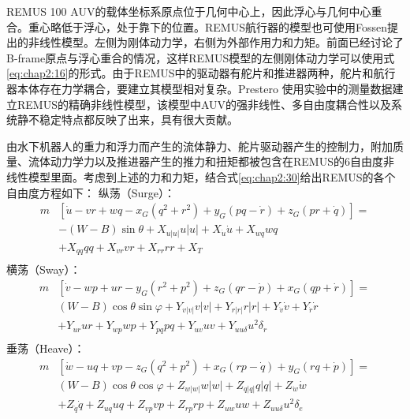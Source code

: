REMUS 100 AUV的载体坐标系原点位于几何中心上，因此浮心与几何中心重合。重心略低于浮心，处于靠下的位置。REMUS航行器的模型也可使用Fossen提出的非线性模型。左侧为刚体动力学，右侧为外部作用力和力矩。前面已经讨论了B-frame原点与浮心重合的情况，这样REMUS模型的左侧刚体动力学可以使用式\ref{eq:chap2:16}的形式。由于REMUS中的驱动器有舵片和推进器两种，舵片和航行器本体存在力学耦合，要建立其模型相对复杂。Prestero\cite{prestero2001verification} 使用实验中的测量数据建立REMUS的精确非线性模型，该模型中AUV的强非线性、多自由度耦合性以及系统静不稳定特点都反映了出来，具有很大贡献。

由水下机器人的重力和浮力而产生的流体静力、舵片驱动器产生的控制力，附加质量、流体动力学力以及推进器产生的推力和扭矩都被包含在REMUS的6自由度非线性模型里面。考虑到上述的力和力矩，结合式\ref{eq:chap2:30}给出REMUS的各个自由度方程如下：
纵荡（Surge）：
\begin{equation}
\label{eq:chap2:surgeremus}
\begin{aligned}
m &\left[ \dot u - vr  + wq - {x_G}({q^2} + {r^2}) + {y_G}(pq - \dot r) + {z_G}(pr + \dot q) \right] =  \\
&- (W - B)\sin \theta  + {X_{u\left| u \right|}}u\left| u \right| + {X_{\dot u}}\dot u + {X_{wq}}wq\\
&+ {X_{qq}}qq + {X_{vr}}vr + {X_{rr}}rr + {X_T}  \\
\end{aligned}
\end{equation}
横荡（Sway）：
\begin{equation}
\label{eq:chap2:swayremus}
\begin{aligned}
 m&\left[ {\dot v - wp + ur - {y_G}({r^2} + {p^2}) + {z_G}(qr - \dot p) + {x_G}(qp + \dot r)} \right] =\\
 & (W - B)\cos \theta \sin \varphi  + {Y_{v\left| v \right|}}v\left| v \right| + {Y_{r\left| r \right|}}r\left| r \right| + {Y_{\dot v}}\dot v + {Y_{\dot r}}\dot r \\
 &+ {Y_{ur}}ur + {Y_{wp}}wp + {Y_{pq}}pq +  {Y_{uv}}uv + {Y_{uu\delta }}{u^2}{\delta _r}  \\
\end{aligned}
\end{equation}
垂荡（Heave）：
\begin{equation}
\label{eq:chap2:heaveremus}
\begin{aligned}
 m&\left[ {\dot w - uq + vp - {z_G}({q^2} + {p^2}) + {x_G}(rp - \dot q) + {y_G}(rq + \dot p)} \right] =\\
 & (W - B)\cos \theta \cos \varphi  + {Z_{w\left| w \right|}}w\left| w \right| + {Z_{q\left| q \right|}}q\left| q \right| + {Z_{\dot w}}\dot w \\
 &+ {Z_{\dot q}}\dot q + {Z_{uq}}uq + {Z_{vp}}vp + {Z_{rp}}rp + {Z_{uw}}uw + {Z_{uu\delta }}{u^2}{\delta _e}  \\
\end{aligned}
\end{equation}
